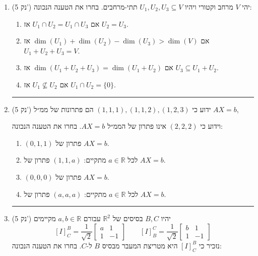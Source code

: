 \documentclass[12pt, a4paper]{article}
\newcommand{\points}[1]{(#1 נק') }
\begin{document}
\begin{enumerate}




\section*{
חלק א' 
(40 נק')
להשחיר את התשובות בטבלה!}
\item\points{5}
 יהי $V$ מרחב וקטורי ויהיו $U_1,U_2,U_3 \subseteq V$ תתי-מרחבים.
בחרו את הטענה הנכונה:

\begin{enumerate}
\item
אם $U_1\cap U_2=U_1\cap U_3$ אז $U_2=U_3$.

\item
אם $\dim(U_1)+\dim(U_2)-\dim(U_3)>\dim(V)$ אז $U_1+U_2+U_3=V$.

\item
אם $\dim(U_1+U_2+U_3)=\dim(U_1+U_2)$ אז $U_3\subseteq U_1+U_2$.

\item
אם $U_1\nsubseteq U_2$ אז $U_1\cap U_2=\{0\}$.
\end{enumerate}

\noindent\rule{\textwidth-30pt}{0.4pt}

\item\points{5}
ידוע כי $(1,1,1),(1,1,2),(1,2,3)$ הם פתרונות של ממ״ל $AX=b$,

וידוע כי $(2,2,2)$ אינו פתרון של הממ״ל $AX=b$. בחרו את הטענה הנכונה:

\begin{enumerate}
\renewcommand{\labelenumi}{\hebrew{enumi}.}
\item
$(0,1,1)$ פתרון של $AX=b$.

\item
לכל $a\in\mathbb{R}$ מתקיים: $(1,1,a)$ פתרון של $AX=b$.

\item
$(0,0,0)$ פתרון של $AX=b$.

\item
לכל $a\in\mathbb{R}$ מתקיים: $(a,a,a)$ פתרון של $AX=b$.
\end{enumerate}

\noindent\rule{\textwidth-30pt}{0.4pt}


\item\points{5}
 יהיו $B,C$ בסיסים של $\mathbb{R}^2$ עבורם $a,b\in\mathbb{R}$ מקיימים
\[
[I]^B_C=\frac{1}{\sqrt{2}}
\begin{bmatrix}
a & 1\\
1 & -1
\end{bmatrix}
\qquad
[I]^C_B=\frac{1}{\sqrt{2}}
\begin{bmatrix}
b & 1\\
1 & -1
\end{bmatrix}
\]
נזכיר כי $[I]^B_C$ היא מטריצת המעבר מבסיס $B$ ל-$C$. בחרו את הטענה הנכונה:


\end{enumerate}
\end{document}
